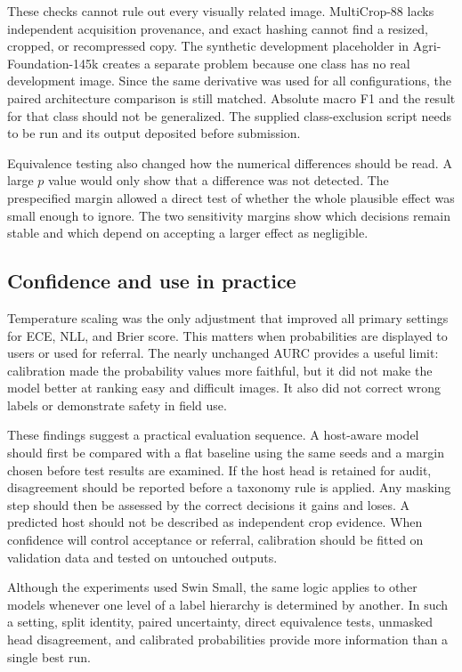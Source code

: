 \documentclass[preprint,12pt]{elsarticle}
\begin{document}
These checks cannot rule out every visually related image. MultiCrop-88 lacks
independent acquisition provenance, and exact hashing cannot find a resized,
cropped, or recompressed copy. The synthetic development placeholder in
Agri-Foundation-145k creates a separate problem because one class has no real
development image. Since the same derivative was used for all configurations,
the paired architecture comparison is still matched. Absolute macro F1 and the
result for that class should not be generalized. The supplied class-exclusion
script needs to be run and its output deposited before submission.

Equivalence testing also changed how the numerical differences should be read.
A large $p$ value would only show that a difference was not detected. The
prespecified margin allowed a direct test of whether the whole plausible effect
was small enough to ignore. The two sensitivity margins show which decisions
remain stable and which depend on accepting a larger effect as negligible.

\subsection{Confidence and use in practice}

Temperature scaling was the only adjustment that improved all primary settings
for ECE, NLL, and Brier score. This matters when probabilities are displayed to
users or used for referral. The nearly unchanged AURC provides a useful limit:
calibration made the probability values more faithful, but it did not make the
model better at ranking easy and difficult images. It also did not correct
wrong labels or demonstrate safety in field use.

These findings suggest a practical evaluation sequence. A host-aware model
should first be compared with a flat baseline using the same seeds and a margin
chosen before test results are examined. If the host head is retained for
audit, disagreement should be reported before a taxonomy rule is applied. Any
masking step should then be assessed by the correct decisions it gains and
loses. A predicted host should not be described as independent crop evidence.
When confidence will control acceptance or referral, calibration should be
fitted on validation data and tested on untouched outputs.

Although the experiments used Swin Small, the same logic applies to other
models whenever one level of a label hierarchy is determined by another. In
such a setting, split identity, paired uncertainty, direct equivalence tests,
unmasked head disagreement, and calibrated probabilities provide more
information than a single best run.
\end{document}
